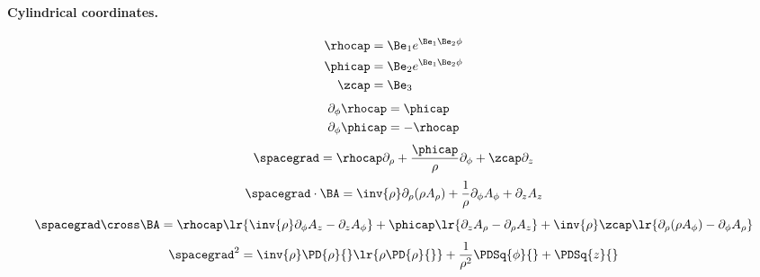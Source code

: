 \paragraph{Cylindrical coordinates.}
%
\begin{equation}\label{eqn:usefulFormulas:720}
\begin{aligned}
\rhocap &= \Be_1 e^{\Be_1 \Be_2 \phi} \\
\phicap &= \Be_2 e^{\Be_1 \Be_2 \phi} \\
\zcap &= \Be_3
\end{aligned}
\end{equation}
%
\begin{equation}\label{eqn:usefulFormulas:740}
\begin{aligned}
\partial_\phi \rhocap &= \phicap \\
\partial_\phi \phicap &= -\rhocap
\end{aligned}
\end{equation}
%
\begin{equation}\label{eqn:usefulFormulas:760}
\spacegrad = \rhocap \partial_\rho + \frac{\phicap}{\rho} \partial_\phi + \zcap \partial_z
\end{equation}
%
\begin{equation}\label{eqn:usefulFormulas:780}
\spacegrad \cdot \BA
=
\inv{\rho} \partial_\rho (\rho A_\rho) + \frac{1}{\rho} \partial_\phi A_\phi + \partial_z A_z
\end{equation}
%
\begin{equation}\label{eqn:usefulFormulas:800}
\spacegrad \cross \BA
=
\rhocap
\lr{
   \inv{\rho} \partial_\phi A_z
   - \partial_z A_\phi
}
+
\phicap
\lr{
   \partial_z A_\rho
   -\partial_\rho A_z
}
+
\inv{\rho} \zcap \lr{
   \partial_\rho ( \rho A_\phi )
   - \partial_\phi A_\rho
}
\end{equation}
%
\begin{equation}\label{eqn:usefulFormulas:820}
\spacegrad^2
=
\inv{\rho} \PD{\rho}{} \lr{ \rho \PD{\rho}{} }
+ \frac{1}{\rho^2} \PDSq{\phi}{}
+ \PDSq{z}{}
\end{equation}
%
